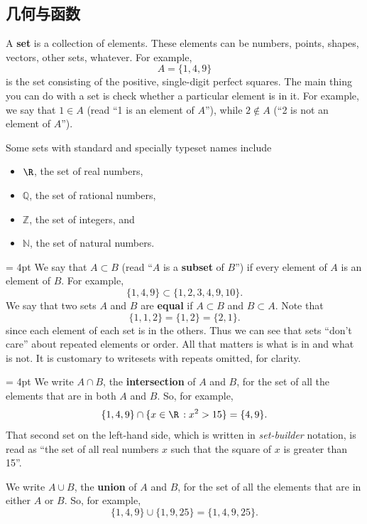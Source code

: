 \documentclass[indent]{watsonbook}
\begin{document}
\subsection{几何与函数}  \label{a:setsandfunctions}

A \textbf{set} is a collection of elements. These elements can be
numbers, points, shapes, vectors, other sets, whatever. For example,
\[
  A = \{1,4,9\}
\]
is the set consisting of the positive, single-digit perfect
squares. The main thing you can do with a set is check whether a
particular element is in it. For example, we say that $1 \in A$ (read
``1 is an element of $A$''), while $2 \notin A$ (``2 is not an element
of $A$'').

\vspace{-8pt}

Some sets with standard and specially typeset names include
\begin{itemize}[topsep=-6pt]
\item $\R$, the set of real numbers,
\item $\mathbb{Q}$, the set of rational numbers,
\item $\mathbb{Z}$, the set of integers, and
\item $\mathbb{N}$, the set of natural numbers.
\end{itemize}

\begin{tcolorbox}[title = Subsets and set equality, parbox = false,
  colframe = MidnightBlue, colback=softblue] \parskip = 4pt
  We say that $A \subset B$ (read ``$A$ is a \textbf{subset} of $B$'')
  if every element of $A$ is an element of $B$. For example,
  \[
    \{1,4,9\} \subset \{1,2,3,4,9,10\}.
  \]
  We say that two sets $A$ and $B$ are \textbf{equal} if $A\subset B$ and $B\subset A$. Note that
  \[
    \{1,1,2\} = \{1,2\} = \{2,1\} .
  \]
  since each element of each set is in the others. Thus we can see that
  sets ``don't care'' about repeated elements or order. All that
matters is what is in and what is not. It is customary to writesets with
  repeats omitted, for clarity.
\end{tcolorbox} \enlargethispage{1cm}

\begin{tcolorbox}[title = Intersections and unions, parbox = false,
  colframe = MidnightBlue, colback=softblue] \parskip = 4pt
  We write $A\cap B$, the \textbf{intersection} of $A$ and $B$, for
  the set of all the elements that are in both $A$ and $B$. So, for
  example,
  \[
    \{1,4,9\} \cap \{ x \in \R \,: x^2 > 15 \} = \{4,9\}.
  \]
  That second set on the left-hand side, which is written in
  \textit{set-builder} notation, is read as ``the set of all real
  numbers $x$ such that the square of $x$ is greater than 15''.

  We write $A\cup B$, the \textbf{union} of $A$ and $B$, for the set
  of all the elements that are in either $A$ or $B$. So, for example,
  \[
    \{1,4,9\} \cup \{1,9,25\} = \{1,4,9,25\}.
  \]
\end{tcolorbox}
\end{document}

